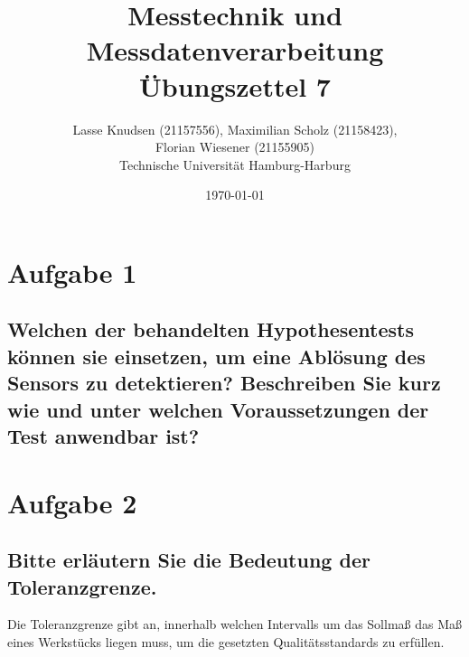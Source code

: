 \documentclass[12pt, a4paper, titlepage]{article}
\title{Messtechnik und Messdatenverarbeitung \\ \"Ubungszettel 7}
\author{Lasse Knudsen (21157556), Maximilian Scholz (21158423), \\
	Florian Wiesener (21155905)  \\
	Technische Universit\"at Hamburg-Harburg \\
}
\date{\today}
\begin{document}
	\maketitle
	 \section{Aufgabe 1}
	 \label{sec:a1}
	 \subsection{Welchen der behandelten Hypothesentests k\"onnen sie einsetzen, um eine Abl\"osung des Sensors zu
	 	detektieren? Beschreiben Sie kurz wie und unter welchen Voraussetzungen der Test anwendbar ist?}
	
	\section{Aufgabe 2}

	\subsection{Bitte erl\"autern Sie die Bedeutung der Toleranzgrenze.}
	Die Toleranzgrenze gibt an, innerhalb welchen Intervalls um das Sollmaß das Maß eines Werkstücks liegen muss,
	um die gesetzten Qualitätsstandards zu erfüllen. 
	
\end{document}
